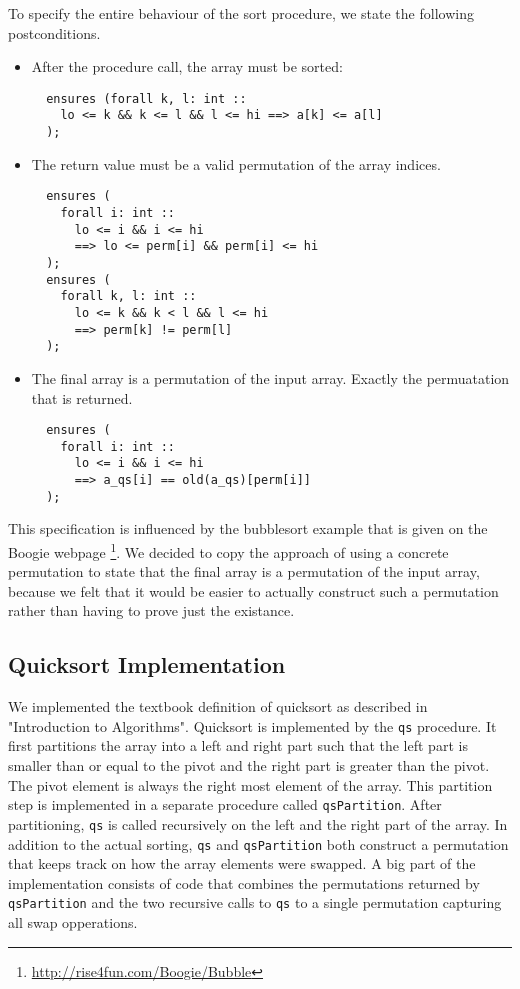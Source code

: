 To specify the entire behaviour of the sort procedure, we state the following postconditions.
\begin{itemize}
\item After the procedure call, the array must be sorted:
  \begin{verbatim}
  ensures (forall k, l: int :: 
    lo <= k && k <= l && l <= hi ==> a[k] <= a[l]
  );
\end{verbatim}

\item The return value must be a valid permutation of the array indices.
  \begin{verbatim}
  ensures (
    forall i: int :: 
      lo <= i && i <= hi 
      ==> lo <= perm[i] && perm[i] <= hi
  );
  ensures (
    forall k, l: int :: 
      lo <= k && k < l && l <= hi 
      ==> perm[k] != perm[l]
  );
\end{verbatim}

\item The final array is a permutation of the input array. Exactly the permuatation that is returned. 
  \begin{verbatim}
  ensures (
    forall i: int :: 
      lo <= i && i <= hi 
      ==> a_qs[i] == old(a_qs)[perm[i]]
  );
\end{verbatim}
 
\end{itemize}

This specification is influenced by the bubblesort example that is 
given on the Boogie webpage \footnote{\url{http://rise4fun.com/Boogie/Bubble}}. We decided to 
copy the approach of using a concrete permutation to state that the final array is a permutation of
the input array, because we felt that it would be easier to actually construct such a permutation rather
than having to prove just the existance.

\subsection{Quicksort Implementation}

We implemented the textbook definition of quicksort as described in "Introduction to Algorithms". 
Quicksort is implemented by the \texttt{qs} procedure. 
It first partitions the array into a left and right part such that the left part is smaller than or equal to
the pivot and the right part is greater than the pivot. The pivot element is always the right most
element of the array. This partition step is implemented in a separate procedure called \texttt{qsPartition}.
After partitioning, \texttt{qs} is called recursively on the left and the right part of the array. 
In addition to the actual sorting, \texttt{qs} and \texttt{qsPartition} both construct a permutation that
keeps track on how the array elements were swapped. A big part of the implementation consists of code that
combines the permutations returned by \texttt{qsPartition} and the two recursive calls to \texttt{qs} to a single permutation
capturing all swap opperations.

